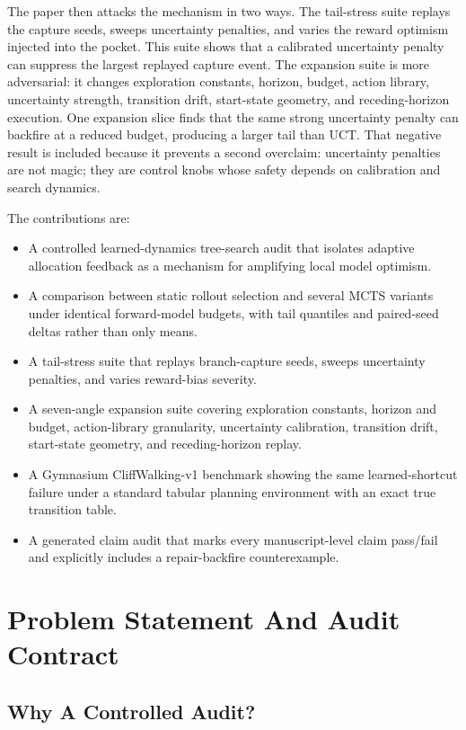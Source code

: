 \documentclass{article}
\begin{document}
The paper then attacks the mechanism in two ways. The tail-stress suite replays the capture seeds, sweeps uncertainty penalties, and varies the reward optimism injected into the pocket. This suite shows that a calibrated uncertainty penalty can suppress the largest replayed capture event. The expansion suite is more adversarial: it changes exploration constants, horizon, budget, action library, uncertainty strength, transition drift, start-state geometry, and receding-horizon execution. One expansion slice finds that the same strong uncertainty penalty can backfire at a reduced budget, producing a larger tail than UCT. That negative result is included because it prevents a second overclaim: uncertainty penalties are not magic; they are control knobs whose safety depends on calibration and search dynamics.

The contributions are:
\begin{itemize}
\item A controlled learned-dynamics tree-search audit that isolates adaptive allocation feedback as a mechanism for amplifying local model optimism.
\item A comparison between static rollout selection and several MCTS variants under identical forward-model budgets, with tail quantiles and paired-seed deltas rather than only means.
\item A tail-stress suite that replays branch-capture seeds, sweeps uncertainty penalties, and varies reward-bias severity.
\item A seven-angle expansion suite covering exploration constants, horizon and budget, action-library granularity, uncertainty calibration, transition drift, start-state geometry, and receding-horizon replay.
\item A Gymnasium CliffWalking-v1 benchmark \citep{towers2024gymnasium} showing the same learned-shortcut failure under a standard tabular planning environment with an exact true transition table.
\item A generated claim audit that marks every manuscript-level claim pass/fail and explicitly includes a repair-backfire counterexample.
\end{itemize}

\section{Problem Statement And Audit Contract}

\subsection{Why A Controlled Audit?}
\end{document}
